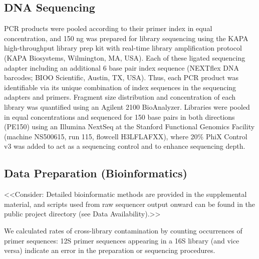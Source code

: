 \documentclass[11pt,letterpaper]{article} %
\begin{document}
\subsection{DNA Sequencing}

PCR products were pooled according to their primer index in equal concentration, and 150 ng was prepared for library sequencing using the KAPA high-throughput library prep kit with real-time library amplification protocol (KAPA Biosystems, Wilmington, MA, USA).
Each of these ligated sequencing adapter including an additional 6 base pair index sequence (NEXTflex DNA barcodes; BIOO Scientific, Austin, TX, USA).
Thus, each PCR product was identifiable via its unique combination of index sequences in the sequencing adapters and primers.
Fragment size distribution and concentration of each library was quantified using an Agilent 2100 BioAnalyzer.
Libraries were pooled in equal concentrations and sequenced for 150 base pairs in both directions (PE150) using an Illumina NextSeq at the Stanford Functional Genomics Facility (machine NS500615, run 115, flowcell H3LFLAFXX), where 20\% PhiX Control v3 was added to act as a sequencing control and to enhance sequencing depth.


\subsection*{Data Preparation (Bioinformatics)}

<<Consider: Detailed bioinformatic methods are provided in the supplemental material, and scripts used from raw sequencer output onward can be found in the public project directory (see Data Availability).>>




%
%
%
We calculated rates of cross-library contamination by counting occurrences of primer sequences: 12S primer sequences appearing in a 16S library (and vice versa) indicate an error in the preparation or sequencing procedures.
\end{document}
